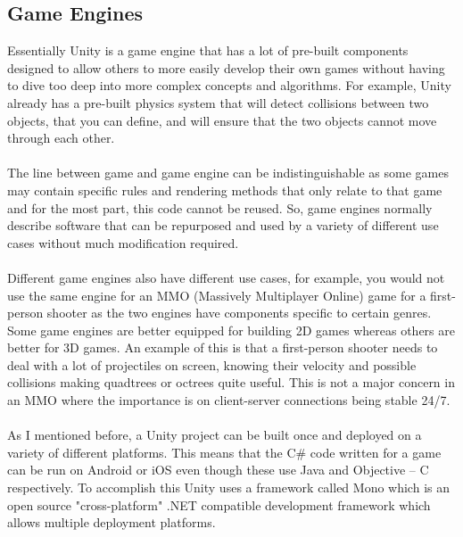 \documentclass[a4paper]{report}
\begin{document}
\subsection{Game Engines}
Essentially Unity is a game engine that has a lot of pre-built components designed to allow others to more easily develop their own games without having to dive too deep into more complex concepts and algorithms. For example, Unity already has a pre-built physics system that will detect collisions between two objects, that you can define, and will ensure that the two objects cannot move through each other.  
\\\\
The line between game and game engine can be indistinguishable as some games may contain specific rules and rendering methods that only relate to that game and for the most part, this code cannot be reused. So, game engines normally describe software that can be repurposed and used by a variety of different use cases without much modification required. \cite{GA}
\\\\
Different game engines also have different use cases, for example, you would not use the same engine for an MMO (Massively Multiplayer Online) game for a first-person shooter as the two engines have components specific to certain genres. Some game engines are better equipped for building 2D games whereas others are better for 3D games. An example of this is that a first-person shooter needs to deal with a lot of projectiles on screen, knowing their velocity and possible collisions making quadtrees or octrees quite useful. This is not a major concern in an MMO where the importance is on client-server connections being stable 24/7. \cite{GA}
\\\\
As I mentioned before, a Unity project can be built once and deployed on a variety of different platforms. This means that the C\# code written for a game can be run on Android or iOS even though these use Java and Objective – C respectively. To accomplish this Unity uses a framework called Mono which is an open source "cross-platform" .NET compatible development framework which allows multiple deployment platforms. \cite{Mono}
\end{document}
